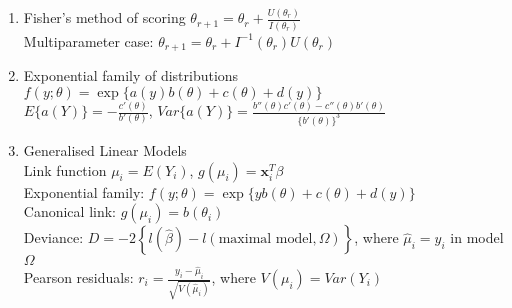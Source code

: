 \documentclass[11pt,a4paper]{article}
\begin{document}
\begin{enumerate}
\item Fisher's method of scoring $\displaystyle \theta_{r+1} = \theta_r + \frac{U(\theta_r)}{I(\theta_r)}$ \\
Multiparameter case: $\theta_{r+1} = \theta_r + I^{-1} (\theta_r) U (\theta_r)$

\item Exponential family of distributions $f(y;\theta) = \exp \{ a(y) b(\theta) + c(\theta) + d(y) \}$ \\
$\displaystyle E\{ a(Y) \} = -\frac{c'(\theta)}{b'(\theta)}$, $\displaystyle Var\{ a(Y) \} = \frac{b''(\theta) c'(\theta) - c''(\theta) b'(\theta)}{\{ b'(\theta) \}^3}$

\item Generalised Linear Models \\
Link function $\mu_i = E(Y_i)$, $g(\mu_i) = \mathbf{x}_i^T \beta$ \\
Exponential family: $f(y;\theta) = \exp \{ y b(\theta) + c(\theta) + d(y) \}$ \\
Canonical link: $g(\mu_i) = b(\theta_i)$ \\
Deviance: $D = -2 \left\{ l(\hat{\beta}) - l(\text{maximal model}, \Omega) \right\}$, where $\hat{\mu}_i = y_i$ in model $\Omega$ \\
Pearson residuals: $\displaystyle r_i = \frac{y_i - \hat{\mu}_i}{\sqrt{V(\hat{\mu}_i)}}$, where $V(\mu_i) = Var(Y_i)$
\end{enumerate}
\end{document}
